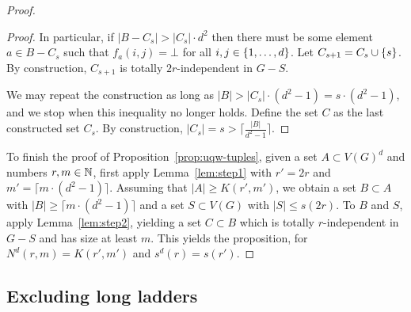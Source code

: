 \begin{proof}
\begin{proof}
In particular, if $|B-C_s|> |C_s|\cdot d^2$
then there must be some element  $a\in B-C_s$  
such that $f_a(i,j)=\bot$  for all $i,j\in\{1,\ldots,d\}$.
Let $C_{s+1}=C_s\cup \{s\}$.
By construction, $C_{s+1}$ is totally $2r$-independent in $G-S$.

We may repeat the construction as long as $|B|>|C_s|\cdot (d^2-1)=s\cdot (d^2-1)$, and we stop when this inequality no longer holds. Define the set $C$ as the last constructed set $C_s$.
By construction, $|C_s|=s>
\lceil\frac{|B|}{d^2-1}\rceil$.	
\end{proof}

To finish the proof of Proposition~\ref{prop:uqw-tuples},
given a set $A\subset V(G)^d$ and numbers $r,m\in\mathbb{N}$,
first apply Lemma~\ref{lem:step1} 
  with $r'=2r$ and
 $m'=\lceil m\cdot ({d^2-1})\rceil$.
 Assuming that $|A|\ge K(r',m')$, 
we obtain a set $B\subset A$ with $|B|\ge \lceil m\cdot {(d^2-1)}\rceil$ and a set $S\subset V(G)$ with $|S|\le s(2r)$.
To $B$ and $S$, apply Lemma~\ref{lem:step2}, yielding a set $C\subset B$ which is totally $r$-independent in $G-S$ and has size at least $m$. This yields the proposition, for $N^d(r,m)=K(r',m')$ and $s^d(r)=s(r')$.
\end{proof}


\subsection{Excluding long ladders}


